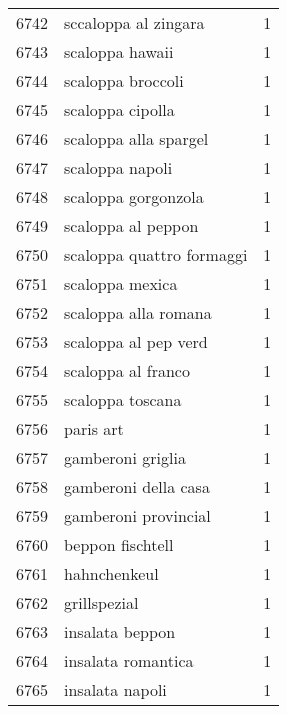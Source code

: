\begin{tabular}{llr}
6742 &                               sccaloppa al zingara &      1 \\
6743 &                                    scaloppa hawaii &      1 \\
6744 &                                  scaloppa broccoli &      1 \\
6745 &                                   scaloppa cipolla &      1 \\
6746 &                              scaloppa alla spargel &      1 \\
6747 &                                    scaloppa napoli &      1 \\
6748 &                                scaloppa gorgonzola &      1 \\
6749 &                                 scaloppa al peppon &      1 \\
6750 &                          scaloppa quattro formaggi &      1 \\
6751 &                                    scaloppa mexica &      1 \\
6752 &                               scaloppa alla romana &      1 \\
6753 &                               scaloppa al pep verd &      1 \\
6754 &                                 scaloppa al franco &      1 \\
6755 &                                   scaloppa toscana &      1 \\
6756 &                                          paris art &      1 \\
6757 &                                  gamberoni griglia &      1 \\
6758 &                               gamberoni della casa &      1 \\
6759 &                               gamberoni provincial &      1 \\
6760 &                                   beppon fischtell &      1 \\
6761 &                                       hahnchenkeul &      1 \\
6762 &                                       grillspezial &      1 \\
6763 &                                    insalata beppon &      1 \\
6764 &                                 insalata romantica &      1 \\
6765 &                                    insalata napoli &      1 \\

\end{tabular}
